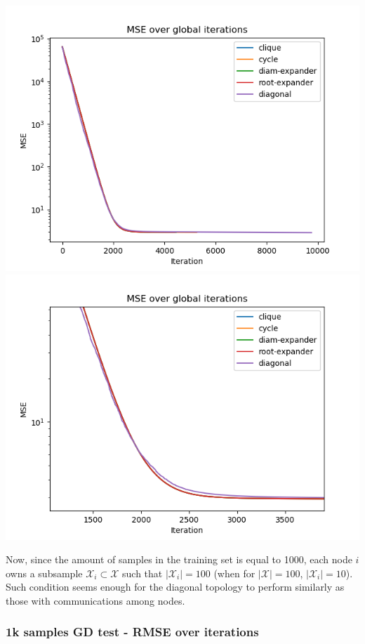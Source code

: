 \documentclass[11pt]{article}
\makeatletter
\def\maxwidth{\ifdim\Gin@nat@width>\linewidth\linewidth
    \else\Gin@nat@width\fi}
\let\Oldincludegraphics\includegraphics
\renewcommand{\includegraphics}[1]{\Oldincludegraphics[width=.8\maxwidth]{#1}}
\makeatother
\begin{document}
\includegraphics{media/img/tests/test_003_1ksamples_classic/2_mse_iter.png}
\includegraphics{media/img/tests/test_003_1ksamples_classic/2_mse_iter_zoom.png}

Now, since the amount of samples in the training set is equal to 1000,
each node \(i\) owns a subsample \(\mathcal{X}_i \subset \mathcal{X}\)
such that \(|\mathcal{X}_i| = 100\) (when for \(|\mathcal{X}|=100\),
\(|\mathcal{X}_i|=10\)). Such condition seems enough for the diagonal
topology to perform similarly as those with communications among nodes.

    \subsubsection{1k samples GD test - RMSE over
iterations}\label{k-samples-gd-test---rmse-over-iterations}
\end{document}
